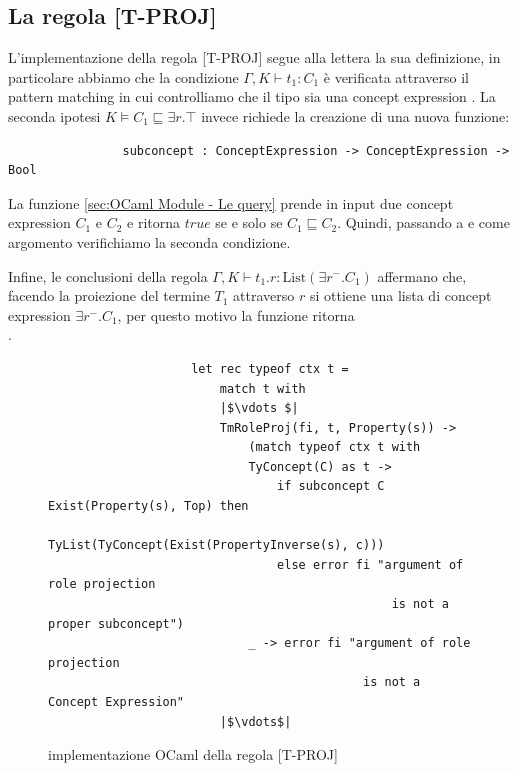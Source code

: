         \subsection{La regola [T-PROJ]}
            L'implementazione della regola [T-PROJ] segue alla lettera la sua definizione, in particolare abbiamo che la condizione $\Gamma,K \vdash t_1 : C_1$
            è verificata attraverso il pattern matching in cui controlliamo che il tipo  sia una concept expression . La seconda ipotesi
            $K \vDash C_1 \sqsubseteq \exists r . \top$ invece richiede la creazione di una nuova funzione:
            \begin{verbatim}
                subconcept : ConceptExpression -> ConceptExpression -> Bool
            \end{verbatim}
            La funzione  \ref{sec:OCaml Module - Le query} prende in input due concept expression $C_1$ e $C_2$ e ritorna $true$ se e solo se $C_1 \sqsubseteq C_2$. Quindi, passando a 
             e  come argomento verifichiamo la seconda condizione.
            
            Infine, le conclusioni della regola $\Gamma,K \vdash t_1.r : \textrm{List}(\exists r^- . C_1)$ affermano che, facendo la proiezione del termine $T_1$ attraverso $r$
            si ottiene una lista di concept expression $\exists r^- . C_1$, per questo motivo la funzione  ritorna \\.
            \begin{figure}[h] 
                \begin{verbatim}
                    let rec typeof ctx t =
                        match t with
                        |$\vdots $|
                        TmRoleProj(fi, t, Property(s)) ->
                            (match typeof ctx t with
                            TyConcept(C) as t ->                                        
                                if subconcept C Exist(Property(s), Top) then 
                                    TyList(TyConcept(Exist(PropertyInverse(s), c)))
                                else error fi "argument of role projection 
                                                is not a proper subconcept")
                            _ -> error fi "argument of role projection 
                                            is not a Concept Expression"
                        |$\vdots$|
                \end{verbatim}
            \caption{implementazione OCaml della regola [T-PROJ]}
            \end{figure}

